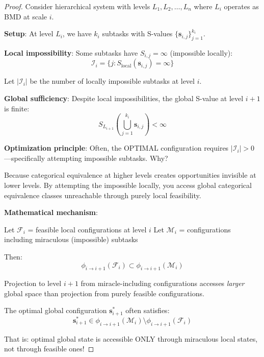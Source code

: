 \documentclass[12pt,a4paper]{article}
\begin{document}
\begin{proof}
Consider hierarchical system with levels $L_1, L_2, \ldots, L_n$ where $L_i$ operates as BMD at scale $i$.

\textbf{Setup}: At level $L_i$, we have $k_i$ subtasks with S-values $\{\mathbf{s}_{i,j}\}_{j=1}^{k_i}$.

\textbf{Local impossibility}: Some subtasks have $S_{i,j} = \infty$ (impossible locally):
\begin{equation}
\mathcal{I}_i = \{j : S_{\text{local}}(\mathbf{s}_{i,j}) = \infty\}
\end{equation}

Let $|\mathcal{I}_i|$ be the number of locally impossible subtasks at level $i$.

\textbf{Global sufficiency}: Despite local impossibilities, the global S-value at level $i+1$ is finite:
\begin{equation}
S_{L_{i+1}}\left(\bigcup_{j=1}^{k_i} \mathbf{s}_{i,j}\right) < \infty
\end{equation}

\textbf{Optimization principle}: Often, the OPTIMAL configuration requires $|\mathcal{I}_i| > 0$—specifically attempting impossible subtasks. Why?

Because categorical equivalence at higher levels creates opportunities invisible at lower levels. By attempting the impossible locally, you access global categorical equivalence classes unreachable through purely local feasibility.

\textbf{Mathematical mechanism}:

Let $\mathcal{F}_i$ = feasible local configurations at level $i$
Let $\mathcal{M}_i$ = configurations including miraculous (impossible) subtasks

Then:
\begin{equation}
\phi_{i \to i+1}(\mathcal{F}_i) \subset \phi_{i \to i+1}(\mathcal{M}_i)
\end{equation}

Projection to level $i+1$ from miracle-including configurations accesses \textit{larger} global space than projection from purely feasible configurations.

The optimal global configuration $\mathbf{s}^*_{i+1}$ often satisfies:
\begin{equation}
\mathbf{s}^*_{i+1} \in \phi_{i \to i+1}(\mathcal{M}_i) \setminus \phi_{i \to i+1}(\mathcal{F}_i)
\end{equation}

That is: optimal global state is accessible ONLY through miraculous local states, not through feasible ones!


\end{proof}
\end{document}
